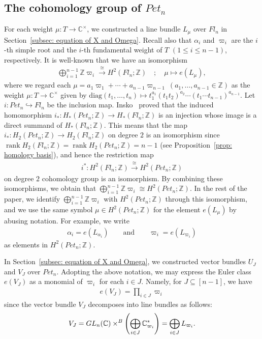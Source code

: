 \documentclass[11pt]{article}
\theoremstyle{definition}
\numberwithin{equation}{section}
\numberwithin{equation}{section}
\DeclareMathOperator{\rank}{rank}
\begin{document}
\subsection{The cohomology group of \texorpdfstring{$Pet_{n}$}{Petn}}
For each weight $\mu\colon T\rightarrow {\mathbb C}^{\times}$, we constructed a line bundle $L_{\mu}$ over $Fl_n$ in Section~\ref{subsec: equation of X and Omega}.
Recall also that $\alpha_i$ and $\varpi_i$ are the $i$-th simple root and the $i$-th fundamental weight of $T$ $(1\le i\le n-1)$, respectively.
It is well-known that we have an isomorphism
\begin{align*}
\bigoplus_{i=1}^{n-1} {\mathbb Z}\varpi_i
\stackrel{\cong}{\rightarrow} H^2(Fl_n;{\mathbb Z}) 
\quad ; \quad
\mu \mapsto e(L_{\mu}),
\end{align*}
where we regard each $\mu=a_1\varpi_1+\cdots+a_{n-1}\varpi_{n-1}\ (a_1,\ldots,a_{n-1}\in{\mathbb Z})$ as the weight $\mu\colon T\rightarrow {\mathbb C}^{\times}$ given by $\text{diag}(t_1,\ldots,t_n)\mapsto t_1^{a_1}(t_1t_2)^{a_2}\cdots(t_1\cdots t_{n-1})^{a_{n-1}}$.
Let~$i\colon Pet_{n}\hookrightarrow Fl_n$ be the inclusion map. Insko~\cite{Insko} proved that the induced homomorphism $i_*\colon H_*(Pet_{n};{\mathbb Z})\rightarrow H_*(Fl_n;{\mathbb Z})$ is an injection whose image is a direct summand of $H_*(Fl_n;{\mathbb Z})$. This means that the map $i_*\colon H_2(Pet_{n};{\mathbb Z}) \rightarrow H_2(Fl_n;{\mathbb Z})$ on degree $2$ is an isomorphism since $\rank H_2(Fl_n;{\mathbb Z})=\rank H_2(Pet_{n};{\mathbb Z}) =n-1$ (see Proposition~\ref{prop: homology basis}), and hence the restriction map 
\begin{align*}
i^*\colon H^2(Fl_n;{\mathbb Z})  \stackrel{\cong}{\rightarrow} H^2(Pet_{n};{\mathbb Z}) 
\end{align*}
on degree $2$ cohomology group is an isomorphism. By combining these isomorphisms, we obtain that $\bigoplus_{i=1}^{n-1} {\mathbb Z}\varpi_i\cong H^2(Pet_{n};{\mathbb Z})$. In the rest of the paper, we identify $\bigoplus_{i=1}^{n-1} {\mathbb Z}\varpi_i$ with $H^2(Pet_{n};{\mathbb Z})$ through this isomorphism, and we use the same symbol $\mu\in H^2(Pet_{n};{\mathbb Z})$ for the element  $e(L_{\mu})$ by abusing notation. For example, we write
\begin{align*}
\alpha_i = e(L_{\alpha_i})
\qquad \text{and} \qquad
\varpi_i = e(L_{\varpi_i})
\end{align*}
as elements in $ H^2(Pet_{n};{\mathbb Z})$.

In Section~\ref{subsec: equation of X and Omega}, we constructed vector bundles $U_J$ and $V_{J}$ over $Pet_{n}$. Adopting the above notation, we may express the Euler class $e(V_J)$ as a monomial of $\varpi_i$ for each $i\in J$. Namely, for $J\subseteq[n-1]$, we have
\begin{align}\label{eq: monomial exp of e(VJ)}
e(V_J) = \prod_{i\in J} \varpi_i
\end{align}
since the vector bundle $V_{J}$ decomposes into line bundles as follows:
\begin{align*}
V_{J} 
= {\rm GL}_n({\mathbb C})\times^B \left(\bigoplus_{i\in J} {\mathbb C}_{\varpi_i}^*\right)
= \bigoplus_{i\in J} L_{\varpi_i}.
\end{align*}
\end{document}
